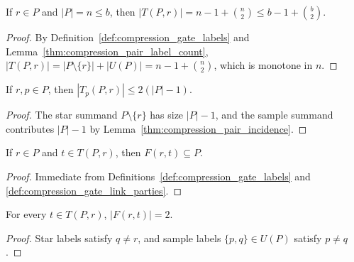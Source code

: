 \begin{lemma}
    \label{thm:compression_gate_label_count}
    \leanok
    If $r\in P$ and $|P|=n\le b$, then $|T(P,r)|=n-1+\binom n2\le b-1+\binom b2$.
\end{lemma}

\begin{proof}\leanok
    By Definition~\ref{def:compression_gate_labels} and Lemma~\ref{thm:compression_pair_label_count}, $|T(P,r)|=|P\setminus\{r\}|+|U(P)|=n-1+\binom n2$, which is monotone in $n$.
\end{proof}

\begin{lemma}
    \label{thm:compression_gate_incidence_bound}
    \leanok
    If $r,p\in P$, then $|T_p(P,r)|\le2(|P|-1)$.
\end{lemma}

\begin{proof}\leanok
    The star summand $P\setminus\{r\}$ has size $|P|-1$, and the sample summand contributes $|P|-1$ by Lemma~\ref{thm:compression_pair_incidence}.
\end{proof}

\begin{lemma}
    \label{thm:compression_gate_locality}
    \leanok
    If $r\in P$ and $t\in T(P,r)$, then $F(r,t)\subseteq P$.
\end{lemma}

\begin{proof}\leanok
    Immediate from Definitions~\ref{def:compression_gate_labels} and \ref{def:compression_gate_link_parties}.
\end{proof}

\begin{lemma}
    \label{thm:compression_gate_two_endpoints}
    \leanok
    For every $t\in T(P,r)$, $|F(r,t)|=2$.
\end{lemma}

\begin{proof}\leanok
    Star labels satisfy $q\ne r$, and sample labels $\{p,q\}\in U(P)$ satisfy $p\ne q$.
\end{proof}

